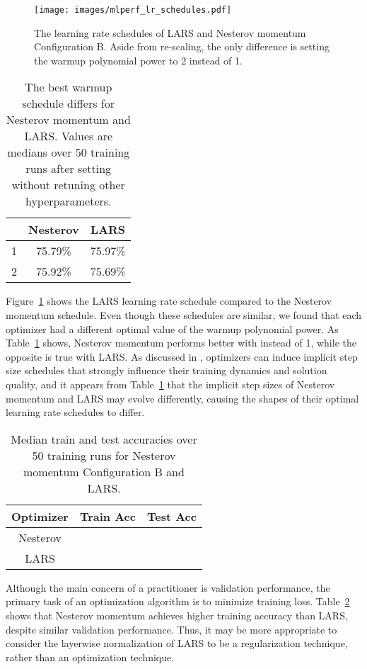 \documentclass{article}
\begin{document}
\begin{figure}[t]
    \centering
    \texttt{[image: images/mlperf\_lr\_schedules.pdf]}
    \caption{The learning rate schedules of LARS and Nesterov momentum Configuration B. Aside from re-scaling, the only difference is setting the warmup polynomial power to 2 instead of 1.}
    \label{fig:mlperf_lr_schedules}
\end{figure}
\begin{table}[t]
\centering
\setlength{\extrarowheight}{3.5pt}
\begin{tabular}{|c|c|c|}
\hline
 & Nesterov & LARS \\ \hline
1 &  75.79\% & 75.97\% \\ \hline
2 & 75.92\% & 75.69\% \\ \hline
\end{tabular}
\caption{The best warmup schedule differs for Nesterov momentum and LARS. Values are medians over 50 training runs after setting  without retuning other hyperparameters.}
\label{table:swap_lr_schedule}
\end{table}
Figure~\ref{fig:mlperf_lr_schedules} shows the LARS learning rate schedule compared to the Nesterov momentum schedule. Even though these schedules are similar, we found that each optimizer had a different optimal value of the warmup polynomial power.
As Table~\ref{table:swap_lr_schedule} shows, Nesterov momentum performs better with  instead of 1, while the opposite is true with LARS.
As discussed in \citet{agarwal2020disentangling}, optimizers can induce implicit step size schedules that strongly influence their training dynamics and solution quality, and it appears from Table~\ref{table:swap_lr_schedule} that the implicit step sizes of Nesterov momentum and LARS may evolve differently, causing the shapes of their optimal learning rate schedules to differ.

\begin{table}[t]
\centering
\setlength{\extrarowheight}{3.5pt}
\begin{tabular}{|c|c|c|}
\hline
Optimizer & Train Acc & Test Acc \\ \hline
Nesterov &  &  \\ \hline
LARS &  &  \\ \hline
\end{tabular}
\caption{Median train and test accuracies over 50 training runs for Nesterov momentum Configuration B and LARS.}\label{table:generalization}
\end{table}
Although the main concern of a practitioner is validation performance, the primary task of an optimization algorithm is to minimize training loss. Table~\ref{table:generalization} shows that Nesterov momentum achieves higher training accuracy than LARS, despite similar validation performance. Thus, it may be more appropriate to consider the layerwise normalization of LARS to be a regularization technique, rather than an optimization technique.
\end{document}
